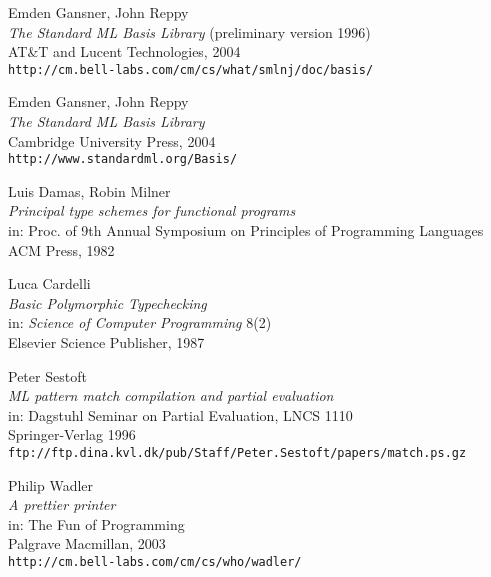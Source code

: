 \documentclass[twoside,titlepage]{article}
\newcommand{\void}[1]{}
\begin{document}
\begin{appendix}
\begin{thebibliography}{MTHM97}
\void{
\bibitem[DHCK06]{typeclasses}
Derek Dreyer, Robert Harper, Manuel Chakravarty, Gabriele Keller \\
{\it Modular Type Classes} \\
Draft, 2006 \\
{\small\tt{http://www.cs.cmu.edu/~rwh/papers/mtc/apr06.pdf}}
}

Emden Gansner, John Reppy \\
{\it The Standard ML Basis Library}
(preliminary version 1996) \\
AT\&T and Lucent Technologies, 2004 \\
{\small\tt{http://cm.bell-labs.com/cm/cs/what/smlnj/doc/basis/}}

Emden Gansner, John Reppy \\
{\it The Standard ML Basis Library} \\
Cambridge University Press, 2004 \\
{\small\tt{http://www.standardml.org/Basis/}}

Luis Damas, Robin Milner \\
{\it Principal type schemes for functional programs} \\
in: Proc. of 9th Annual Symposium on Principles of Programming Languages \\
ACM Press, 1982

Luca Cardelli \\
{\it Basic Polymorphic Typechecking} \\
in: {\it Science of Computer Programming} 8(2) \\
Elsevier Science Publisher, 1987

Peter Sestoft \\
{\it ML pattern match compilation and partial evaluation} \\
in: Dagstuhl Seminar on Partial Evaluation, LNCS 1110 \\
Springer-Verlag 1996 \\
{\small\tt{ftp://ftp.dina.kvl.dk/pub/Staff/Peter.Sestoft/papers/match.ps.gz}}

Philip Wadler \\
{\it A prettier printer} \\
in: The Fun of Programming \\
Palgrave Macmillan, 2003 \\
{\small\tt{http://cm.bell-labs.com/cm/cs/who/wadler/}}


\end{thebibliography}
\end{appendix}
\end{document}
